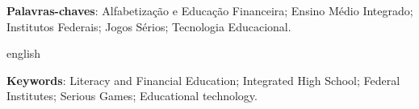 
\setlength{\absparsep}{18pt} %
\begin{resumo}
	
	\vspace{\onelineskip}
    
 	\noindent 
	\textbf{Palavras-chaves}: Alfabetização e Educação Financeira; Ensino Médio Integrado; Institutos Federais; Jogos Sérios; Tecnologia Educacional.
\end{resumo}

\begin{resumo}[Abstract]
\begin{otherlanguage*}{english}

    
	\vspace{\onelineskip}
 
	\noindent 
	\textbf{Keywords}: Literacy and Financial Education; Integrated High School; Federal Institutes; Serious Games; Educational technology.
\end{otherlanguage*}
\end{resumo}

 

  
